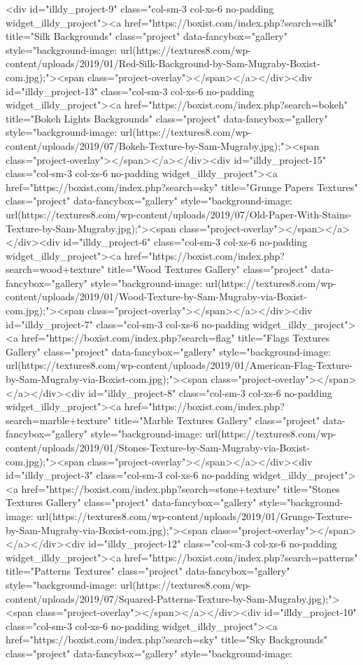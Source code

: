 				<div id="illdy_project-9" class="col-sm-3 col-xs-6 no-padding widget_illdy_project"><a href="https://boxist.com/index.php?search=silk" title="Silk Backgrounds" class="project" data-fancybox="gallery" style="background-image: url(https://textures8.com/wp-content/uploads/2019/01/Red-Silk-Background-by-Sam-Mugraby-Boxist-com.jpg);"><span class="project-overlay"></span></a></div><div id="illdy_project-13" class="col-sm-3 col-xs-6 no-padding widget_illdy_project"><a href="https://boxist.com/index.php?search=bokeh" title="Bokeh Lights Backgrounds" class="project" data-fancybox="gallery" style="background-image: url(https://textures8.com/wp-content/uploads/2019/07/Bokeh-Texture-by-Sam-Mugraby.jpg);"><span class="project-overlay"></span></a></div><div id="illdy_project-15" class="col-sm-3 col-xs-6 no-padding widget_illdy_project"><a href="https://boxist.com/index.php?search=sky" title="Grunge Papers Textures" class="project" data-fancybox="gallery" style="background-image: url(https://textures8.com/wp-content/uploads/2019/07/Old-Paper-With-Stains-Texture-by-Sam-Mugraby.jpg);"><span class="project-overlay"></span></a></div><div id="illdy_project-6" class="col-sm-3 col-xs-6 no-padding widget_illdy_project"><a href="https://boxist.com/index.php?search=wood+texture" title="Wood Textures Gallery" class="project" data-fancybox="gallery" style="background-image: url(https://textures8.com/wp-content/uploads/2019/01/Wood-Texture-by-Sam-Mugraby-via-Boxist-com.jpg);"><span class="project-overlay"></span></a></div><div id="illdy_project-7" class="col-sm-3 col-xs-6 no-padding widget_illdy_project"><a href="https://boxist.com/index.php?search=flag" title="Flags Textures Gallery" class="project" data-fancybox="gallery" style="background-image: url(https://textures8.com/wp-content/uploads/2019/01/American-Flag-Texture-by-Sam-Mugraby-via-Boxist-com.jpg);"><span class="project-overlay"></span></a></div><div id="illdy_project-8" class="col-sm-3 col-xs-6 no-padding widget_illdy_project"><a href="https://boxist.com/index.php?search=marble+texture" title="Marble Textures Gallery" class="project" data-fancybox="gallery" style="background-image: url(https://textures8.com/wp-content/uploads/2019/01/Stones-Texture-by-Sam-Mugraby-via-Boxist-com.jpg);"><span class="project-overlay"></span></a></div><div id="illdy_project-3" class="col-sm-3 col-xs-6 no-padding widget_illdy_project"><a href="https://boxist.com/index.php?search=stone+texture" title="Stones Textures Gallery" class="project" data-fancybox="gallery" style="background-image: url(https://textures8.com/wp-content/uploads/2019/01/Grunge-Texture-by-Sam-Mugraby-via-Boxist-com.jpg);"><span class="project-overlay"></span></a></div><div id="illdy_project-12" class="col-sm-3 col-xs-6 no-padding widget_illdy_project"><a href="https://boxist.com/index.php?search=patterns" title="Patterns Textures" class="project" data-fancybox="gallery" style="background-image: url(https://textures8.com/wp-content/uploads/2019/07/Squared-Patterns-Texture-by-Sam-Mugraby.jpg);"><span class="project-overlay"></span></a></div><div id="illdy_project-10" class="col-sm-3 col-xs-6 no-padding widget_illdy_project"><a href="https://boxist.com/index.php?search=sky" title="Sky Backgrounds" class="project" data-fancybox="gallery" style="background-image: 